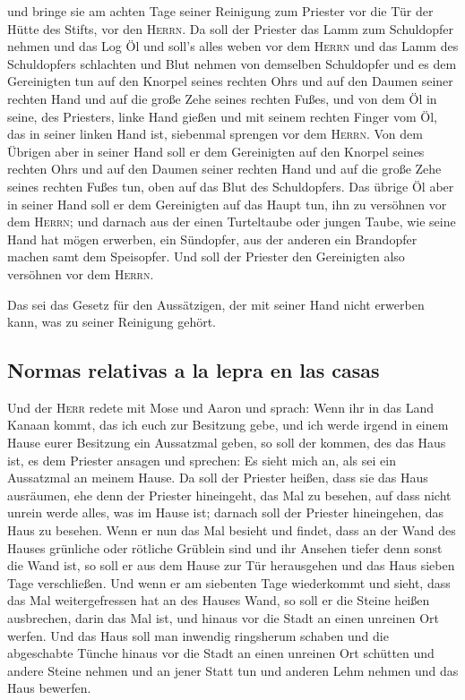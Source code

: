  und bringe sie am achten Tage seiner Reinigung zum
Priester vor die Tür der Hütte des Stifts, vor den \textsc{Herrn}.
 Da soll der Priester das Lamm zum Schuldopfer nehmen und
das Log Öl und soll's alles weben vor dem \textsc{Herrn} 
und das Lamm des Schuldopfers schlachten und Blut nehmen von demselben
Schuldopfer und es dem Gereinigten tun auf den Knorpel seines rechten
Ohrs und auf den Daumen seiner rechten Hand und auf die große Zehe
seines rechten Fußes,  und von dem Öl in seine, des
Priesters, linke Hand gießen  und mit seinem rechten
Finger vom Öl, das in seiner linken Hand ist, siebenmal sprengen vor dem
\textsc{Herrn}.  Von dem Übrigen aber in seiner Hand soll
er dem Gereinigten auf den Knorpel seines rechten Ohrs und auf den
Daumen seiner rechten Hand und auf die große Zehe seines rechten Fußes
tun, oben auf das Blut des Schuldopfers.  Das übrige Öl
aber in seiner Hand soll er dem Gereinigten auf das Haupt tun, ihn zu
versöhnen vor dem \textsc{Herrn};  und darnach aus der
einen Turteltaube oder jungen Taube, wie seine Hand hat mögen erwerben,
 ein Sündopfer, aus der anderen ein Brandopfer machen
samt dem Speisopfer. Und soll der Priester den Gereinigten also
versöhnen vor dem \textsc{Herrn}.

 Das sei das Gesetz für den Aussätzigen, der mit seiner
Hand nicht erwerben kann, was zu seiner Reinigung gehört.

\hypertarget{normas-relativas-a-la-lepra-en-las-casas}{%
\subsection{Normas relativas a la lepra en las
casas}\label{normas-relativas-a-la-lepra-en-las-casas}}

 Und der \textsc{Herr} redete mit Mose und Aaron und
sprach:  Wenn ihr in das Land Kanaan kommt, das ich euch
zur Besitzung gebe, und ich werde irgend in einem Hause eurer Besitzung
ein Aussatzmal geben,  so soll der kommen, des das Haus
ist, es dem Priester ansagen und sprechen: Es sieht mich an, als sei ein
Aussatzmal an meinem Hause.  Da soll der Priester heißen,
dass sie das Haus ausräumen, ehe denn der Priester hineingeht, das Mal
zu besehen, auf dass nicht unrein werde alles, was im Hause ist; darnach
soll der Priester hineingehen, das Haus zu besehen.  Wenn
er nun das Mal besieht und findet, dass an der Wand des Hauses grünliche
oder rötliche Grüblein sind und ihr Ansehen tiefer denn sonst die Wand
ist,  so soll er aus dem Hause zur Tür herausgehen und
das Haus sieben Tage verschließen.  Und wenn er am
siebenten Tage wiederkommt und sieht, dass das Mal weitergefressen hat
an des Hauses Wand,  so soll er die Steine heißen
ausbrechen, darin das Mal ist, und hinaus vor die Stadt an einen
unreinen Ort werfen.  Und das Haus soll man inwendig
ringsherum schaben und die abgeschabte Tünche hinaus vor die Stadt an
einen unreinen Ort schütten  und andere Steine nehmen und
an jener Statt tun und anderen Lehm nehmen und das Haus bewerfen.

